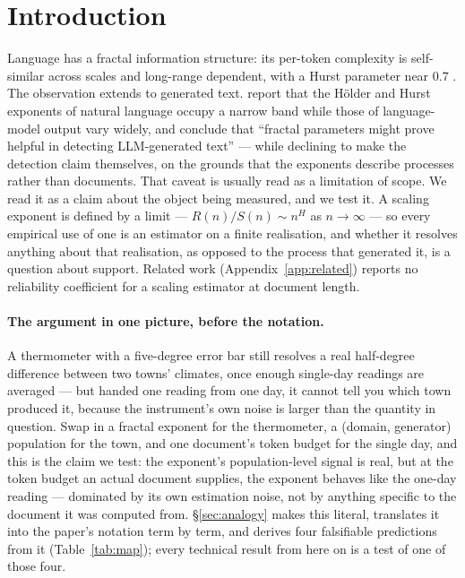 \documentclass{article}
\begin{document}
\section{Introduction}
\label{sec:intro}

Language has a fractal information structure: its per-token complexity is
self-similar across scales and long-range dependent, with a Hurst parameter near
$0.7$ \citep{alabdulmohsin2024fractal}. The observation extends to
generated text. \citet{alabdulmohsin2025tale} report that the H\"older and Hurst
exponents of natural language occupy a narrow band while those of language-model
output vary widely, and conclude that ``fractal parameters might prove helpful in
detecting LLM-generated text'' --- while declining to make the detection claim
themselves, on the grounds that the exponents describe processes rather than
documents. That caveat is usually read as a limitation of scope. We read it as a claim about
the object being measured, and we test it. A scaling exponent is defined by a limit
--- $R(n)/S(n)\sim n^{H}$ as $n\to\infty$ --- so every empirical use of one is an
estimator on a finite realisation, and whether it resolves anything about that
realisation, as opposed to the process that generated it, is a question about
support. Related work (Appendix~\ref{app:related}) reports no reliability
coefficient for a scaling estimator at document length.

\paragraph{The argument in one picture, before the notation.} A thermometer
with a five-degree error bar still resolves a real half-degree difference
between two towns' climates, once enough single-day readings are averaged
--- but handed one reading from one day, it cannot tell you which town
produced it, because the instrument's own noise is larger than the quantity
in question. Swap in a fractal exponent for the thermometer, a (domain,
generator) population for the town, and one document's token budget for the
single day, and this is the claim we test: the exponent's population-level
signal is real, but at the token budget an actual document supplies, the
exponent behaves like the one-day reading --- dominated by its own
estimation noise, not by anything specific to the document it was computed
from. \S\ref{sec:analogy} makes this literal, translates it into the
paper's notation term by term, and derives four falsifiable predictions
from it (Table~\ref{tab:map}); every technical result from here on is a
test of one of those four.
\end{document}
